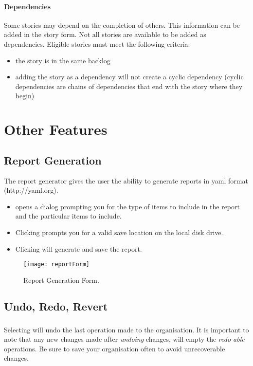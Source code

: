 \documentclass[11pt,fleqn]{book} %
\begin{document}
\subsubsection{Dependencies}
Some stories may depend on the completion of others. This information can be
added in the story form. 
Not all stories are available to be added as dependencies. Eligible stories must
meet the following criteria:
\begin{itemize}
\item the story is in the same backlog
\item adding the story as a dependency will not create a cyclic dependency
(cyclic dependencies are chains of dependencies that end with the story where
they begin)
\end{itemize}


\chapter{Other Features}
\section{Report Generation}
The report generator gives the user the ability to generate reports in yaml format (http://yaml.org).
\begin{itemize}
  \item {} opens a dialog prompting you for the type of items to include in the report and the particular items to include.
  \item Clicking  prompts you for a valid save location on the local disk drive.
  \item Clicking  will generate and save the report.
\end{itemize}

\begin{figure}[H]
  \centering
  \texttt{[image: reportForm]}
  \caption{Report Generation Form.\label{reportForm}}
\end{figure}

\section{Undo, Redo, Revert}
\paragraph{}
Selecting  will undo the last operation made to the organisation. It is important to note that any
new changes made after \textit{undoing} changes, will empty the
\textit{redo-able} operations. Be sure to save your organisation often to avoid
unrecoverable changes.
\end{document}
